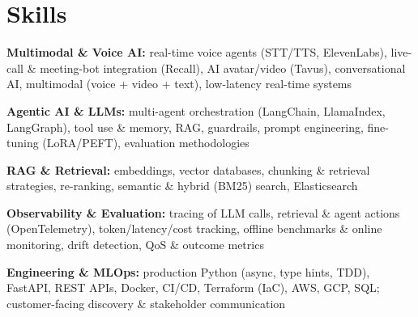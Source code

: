\documentclass[10pt,a4paper]{article}
\begin{document}
\section{Skills}
\begin{tight}
  \item[\textcolor{accent}{\small$\bullet$}] \textbf{Multimodal \& Voice AI:} real-time voice agents (STT/TTS, ElevenLabs), live-call \& meeting-bot integration (Recall), AI avatar/video (Tavus), conversational AI, multimodal (voice + video + text), low-latency real-time systems
  \item[\textcolor{accent}{\small$\bullet$}] \textbf{Agentic AI \& LLMs:} multi-agent orchestration (LangChain, LlamaIndex, LangGraph), tool use \& memory, RAG, guardrails, prompt engineering, fine-tuning (LoRA/PEFT), evaluation methodologies
  \item[\textcolor{accent}{\small$\bullet$}] \textbf{RAG \& Retrieval:} embeddings, vector databases, chunking \& retrieval strategies, re-ranking, semantic \& hybrid (BM25) search, Elasticsearch
  \item[\textcolor{accent}{\small$\bullet$}] \textbf{Observability \& Evaluation:} tracing of LLM calls, retrieval \& agent actions (OpenTelemetry), token/latency/cost tracking, offline benchmarks \& online monitoring, drift detection, QoS \& outcome metrics
  \item[\textcolor{accent}{\small$\bullet$}] \textbf{Engineering \& MLOps:} production Python (async, type hints, TDD), FastAPI, REST APIs, Docker, CI/CD, Terraform (IaC), AWS, GCP, SQL; customer-facing discovery \& stakeholder communication
\end{tight}

\end{document}
